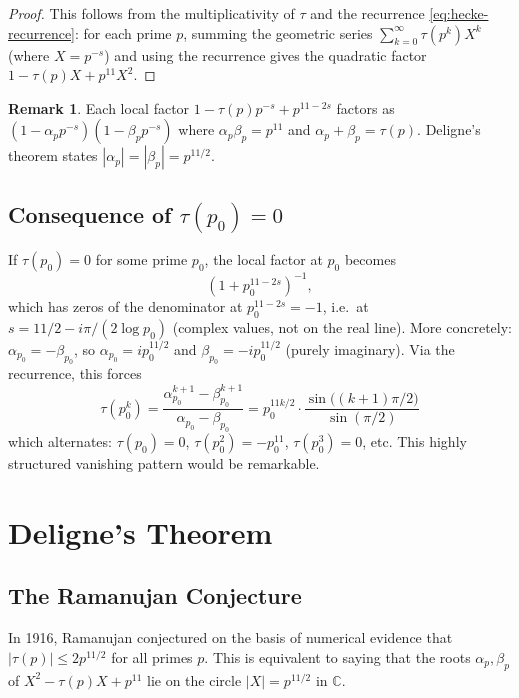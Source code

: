 \documentclass[12pt,a4paper]{amsart}
\theoremstyle{definition}
\newtheorem{remark}[theorem]{Remark}
\begin{document}
\begin{proof}
  This follows from the multiplicativity of $\tau$ and the recurrence
  \eqref{eq:hecke-recurrence}: for each prime $p$, summing the geometric series
  $\sum_{k=0}^\infty \tau(p^k) X^k$ (where $X = p^{-s}$) and using the
  recurrence gives the quadratic factor $1 - \tau(p)X + p^{11}X^2$.
\end{proof}

\begin{remark}
  Each local factor $1 - \tau(p)p^{-s} + p^{11-2s}$ factors as
  $(1 - \alpha_p p^{-s})(1 - \beta_p p^{-s})$ where $\alpha_p \beta_p = p^{11}$
  and $\alpha_p + \beta_p = \tau(p)$. Deligne's theorem states
  $|\alpha_p| = |\beta_p| = p^{11/2}$.
\end{remark}

\subsection{Consequence of $\tau(p_0) = 0$}

If $\tau(p_0) = 0$ for some prime $p_0$, the local factor at $p_0$ becomes
\[
  (1 + p_0^{11-2s})^{-1},
\]
which has zeros of the denominator at $p_0^{11-2s} = -1$, i.e.\ at
$s = 11/2 - i\pi/(2\log p_0)$ (complex values, not on the real line).
More concretely: $\alpha_{p_0} = -\beta_{p_0}$, so $\alpha_{p_0} = ip_0^{11/2}$ and
$\beta_{p_0} = -ip_0^{11/2}$ (purely imaginary). Via the recurrence, this forces
\[
  \tau(p_0^k) =
  \frac{\alpha_{p_0}^{k+1} - \beta_{p_0}^{k+1}}{\alpha_{p_0} - \beta_{p_0}}
  = p_0^{11k/2} \cdot \frac{\sin\bigl((k+1)\pi/2\bigr)}{\sin(\pi/2)}
\]
which alternates: $\tau(p_0) = 0$, $\tau(p_0^2) = -p_0^{11}$,
$\tau(p_0^3) = 0$, etc. This highly structured vanishing pattern would be
remarkable.

\section{Deligne's Theorem}
\label{sec:deligne}

\subsection{The Ramanujan Conjecture}

In 1916, Ramanujan conjectured on the basis of numerical evidence that
$|\tau(p)| \leq 2p^{11/2}$ for all primes $p$. This is equivalent to saying that
the roots $\alpha_p, \beta_p$ of $X^2 - \tau(p)X + p^{11}$ lie on the circle
$|X| = p^{11/2}$ in $\mathbb{C}$.
\end{document}
